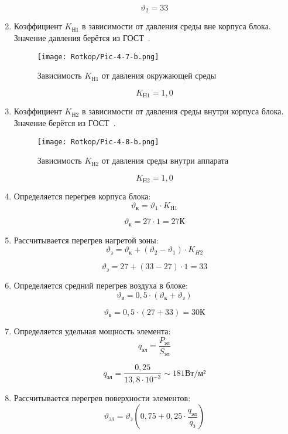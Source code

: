 \begin{enumerate}
$$\vartheta_2 = 33  $$ 

\item Коэффициент $K_{Н1}$ в зависимости от давления среды вне корпуса
блока. Значение давления берётся из ГОСТ~\cite{GOST-15150-69}.

\begin{figure}[H]
  \centering
  \texttt{[image: Rotkop/Pic-4-7-b.png]}
  \caption{Зависимость  $K_{Н1}$ от давления окружающей среды}
\end{figure}
$$K_{Н1}= 1,0$$

\item Коэффициент $K_{Н2}$ в зависимости от давления
  среды внутри корпуса блока.
  Значение берётся из ГОСТ~\cite{GOST-15150-69}.

  \begin{figure}[H]
  \centering
  \texttt{[image: Rotkop/Pic-4-8-b.png]}
  \caption{Зависимость  $K_{Н2}$ от давления среды внутри аппарата}
\end{figure}
$$K_{Н2}= 1,0$$

\item Определяется перегрев корпуса блока:
  \begin{equation}
    \vartheta_к = \vartheta_1 \cdot K_{Н1}
  \end{equation}

  $$\vartheta_к = 27 \cdot 1 = 27 К$$
\item Рассчитывается перегрев нагретой зоны:
%
\begin{equation}
  \vartheta_з = \vartheta_к + (\vartheta_2 - \vartheta_1) \cdot K_{H2}
\end{equation}

$$\vartheta_з = 27 + (33 - 27) \cdot 1 = 33$$

\item Определяется средний перегрев воздуха в блоке:
%
\begin{equation}
  \vartheta_в = 0,5 \cdot (\vartheta_к + \vartheta_з)
\end{equation}

$$\vartheta_в = 0,5 \cdot (27 + 33) = 30К$$
\item Определяется удельная мощность элемента:
  \begin{equation}
    q_{эл} = \frac{P_{эл}}{S_{эл}}
  \end{equation}

  $$q_{эл}=\frac{0,25}{13,8 \cdot 10^{-3}} \sim 181 Вт/м²$$

\item Рассчитывается перегрев поверхности элементов:
  \begin{equation}
    \vartheta_{эл} = \vartheta_{з}\left(0,75 + 0,25 \cdot \frac{q_{эл}}{q_{з}}\right)
  \end{equation}


\end{enumerate}
